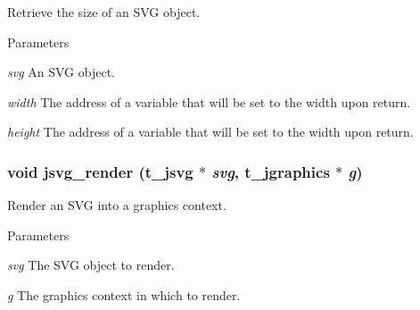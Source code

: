 Retrieve the size of an SVG object. 
\begin{DoxyParams}{Parameters}
\item[{\em svg}]An SVG object. \item[{\em width}]The address of a variable that will be set to the width upon return. \item[{\em height}]The address of a variable that will be set to the width upon return. \end{DoxyParams}
\hypertarget{group__jsvg_gab30c5cd674073ae36d226a89f0825ecd}{
\subsubsection[{jsvg\_\-render}]{\setlength{\rightskip}{0pt plus 5cm}void jsvg\_\-render ({\bf t\_\-jsvg} $\ast$ {\em svg}, \/  {\bf t\_\-jgraphics} $\ast$ {\em g})}}
\label{group__jsvg_gab30c5cd674073ae36d226a89f0825ecd}


Render an SVG into a graphics context. 
\begin{DoxyParams}{Parameters}
\item[{\em svg}]The SVG object to render. \item[{\em g}]The graphics context in which to render. \end{DoxyParams}
